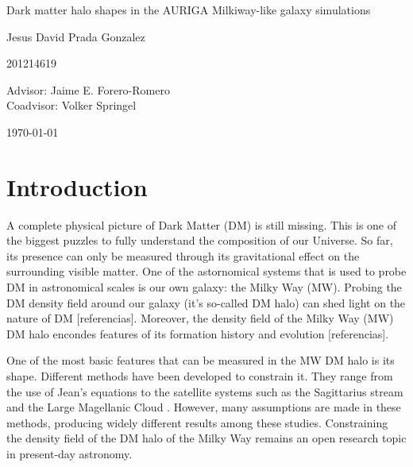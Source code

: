 \documentclass[12pt]{article}
\begin{document}
\begin{center}
\Huge
Dark matter halo shapes in the AURIGA Milkiway-like galaxy simulations

\vspace{3mm}
\Large Jesus David Prada Gonzalez

\large
201214619


\vspace{2mm}
\Large
Advisor: Jaime E. Forero-Romero\\
Coadvisor: Volker Springel
\normalsize
\vspace{2mm}

\today
\end{center}


\normalsize
\section{Introduction}


A complete physical picture of Dark Matter (DM) is still missing.
This is one of the biggest puzzles to fully understand the composition of our Universe.
So far, its presence can only be measured through its gravitational effect on the surrounding visible matter. 
One of the astornomical systems that is used to probe DM in astronomical scales is our own galaxy: the Milky Way (MW).
Probing the DM density field around our galaxy (it's so-called DM halo) can shed light on the nature of DM [referencias]. 
Moreover, the density field of the Milky Way (MW) DM halo encondes features of its formation history and evolution [referencias].

One of the most basic features that can be measured in the MW DM halo is its shape. 
Different methods have been developed to constrain it. 
They range from the use of Jean's equations \cite{Loebman et al. 2012} to the satellite systems such as the Sagittarius stream and the Large Magellanic Cloud \cite{Vera-Ciro et al  2013, Deg & Widrow 2012, Law & Majewski 2010}. 
However, many assumptions are made in these methods, producing widely different results among these studies.
Constraining the density field of the DM halo of the Milky Way remains an open research topic in present-day astronomy. 
\end{document}
